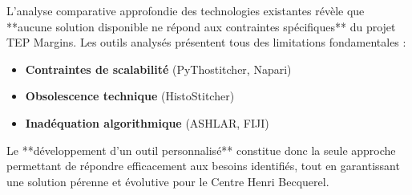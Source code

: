 \documentclass[11pt,a4paper]{article}
\begin{document}
L'analyse comparative approfondie des technologies existantes révèle que **aucune solution disponible ne répond aux contraintes spécifiques** du projet TEP Margins. Les outils analysés présentent tous des limitations fondamentales :

\begin{itemize}[leftmargin=*]
    \item \textbf{Contraintes de scalabilité} (PyThostitcher, Napari)
    \item \textbf{Obsolescence technique} (HistoStitcher)
    \item \textbf{Inadéquation algorithmique} (ASHLAR, FIJI)
\end{itemize}

Le **développement d'un outil personnalisé** constitue donc la seule approche permettant de répondre efficacement aux besoins identifiés, tout en garantissant une solution pérenne et évolutive pour le Centre Henri Becquerel.
\end{document}
